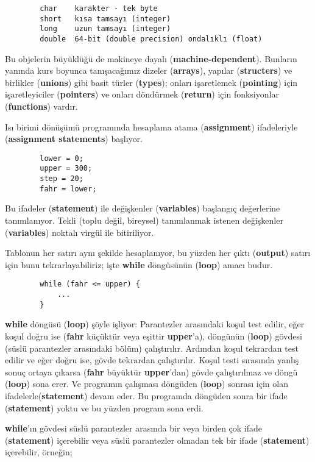 \documentclass[a4paper,12pt,oneside]{book}
\begin{document}
\begin{lstlisting}
        char    karakter - tek byte
        short   kısa tamsayı (integer)
        long    uzun tamsayı (integer)
        double  64-bit (double precision) ondalıklı (float)
\end{lstlisting}
Bu objelerin büyüklüğü de makineye dayalı (\textbf{machine-dependent}). Bunların yanında kurs boyunca tanışacağımız dizeler (\textbf{arrays}), yapılar (\textbf{structers}) ve birlikler (\textbf{unions}) gibi basit türler (\textbf{types}); onları işaretlemek (\textbf{pointing}) için işaretleyiciler (\textbf{pointers}) ve onları döndürmek (\textbf{return}) için fonksiyonlar (\textbf{functions}) vardır. \pagebreak
\par Isı birimi dönüşümü programında hesaplama atama (\textbf{assignment}) ifadeleriyle (\textbf{assignment statements}) başlıyor.
\begin{lstlisting}
        lower = 0;
        upper = 300;
        step = 20;
        fahr = lower;
\end{lstlisting}
Bu ifadeler (\textbf{statement}) ile değişkenler (\textbf{variables}) başlangıç değerlerine tanımlanıyor. Tekli (toplu değil, bireysel) tanımlanmak istenen değişkenler (\textbf{variables}) noktalı virgül ile bitiriliyor.
\par Tablonun her satırı aynı şekilde hesaplanıyor, bu yüzden her çıktı (\textbf{output}) satırı için bunu tekrarlayabiliriz; işte \textbf{while} döngüsünün (\textbf{loop}) amacı budur.
\begin{lstlisting}
        while (fahr <= upper) {
            ...
        }
\end{lstlisting}
\textbf{while} döngüsü (\textbf{loop}) şöyle işliyor: Parantezler arasındaki koşul test edilir, eğer koşul doğru ise (\textbf{fahr} küçüktür veya eşittir \textbf{upper}'a), döngünün (\textbf{loop}) gövdesi (süslü parantezler arasındaki bölüm) çalıştırılır. Ardından koşul tekrardan test edilir ve eğer doğru ise, gövde tekrardan çalıştırılır. Koşul testi sırasında yanlış sonuç ortaya çıkarsa (\textbf{fahr} büyüktür \textbf{upper}'dan) gövde çalıştırılmaz ve döngü (\textbf{loop}) sona erer. Ve programın çalışması döngüden (\textbf{loop}) sonrası için olan ifadelerle(\textbf{statement}) devam eder. Bu programda döngüden sonra bir ifade (\textbf{statement}) yoktu ve bu yüzden program sona erdi.
\par \textbf{while}'ın gövdesi süslü parantezler arasında bir veya birden çok ifade (\textbf{statement}) içerebilir veya süslü parantezler olmadan tek bir ifade (\textbf{statement}) içerebilir, örneğin;
\end{document}
